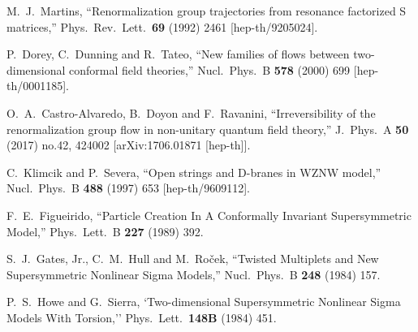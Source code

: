 \documentclass[12pt]{article}
\begin{document}
\begin{thebibliography}{99}
{  
     
  M.~J.~Martins,
  ``Renormalization group trajectories from resonance factorized S matrices,''
  Phys.\ Rev.\ Lett.\  {\bf 69} (1992) 2461
  [hep-th/9205024].


  P.~Dorey, C.~Dunning and R.~Tateo,
  ``New families of flows between two-dimensional conformal field theories,''
  Nucl.\ Phys.\ B {\bf 578} (2000) 699
  [hep-th/0001185].
  
  O.~A.~Castro-Alvaredo, B.~Doyon and F.~Ravanini,
  ``Irreversibility of the renormalization group flow in non-unitary quantum field theory,''
  J.\ Phys.\ A {\bf 50} (2017) no.42,  424002
  [arXiv:1706.01871 [hep-th]].
  
  C.~Klimcik and P.~Severa,
  ``Open strings and D-branes in WZNW model,''
  Nucl.\ Phys.\ B {\bf 488} (1997) 653
  [hep-th/9609112].
  
  F.~E.~Figueirido,
  ``Particle Creation In A Conformally Invariant Supersymmetric Model,''
  Phys.\ Lett.\ B {\bf 227} (1989) 392.

  
  
  S.~J.~Gates, Jr., C.~M.~Hull and M.~Ro\v cek,
  ``Twisted Multiplets and New Supersymmetric Nonlinear Sigma Models,''
  Nucl.\ Phys.\ B {\bf 248} (1984) 157.

  P.~S.~Howe and G.~Sierra,
  `Two-dimensional Supersymmetric Nonlinear Sigma Models With Torsion,''
  Phys.\ Lett.\  {\bf 148B} (1984) 451.
  
}
\end{thebibliography}
\end{document}
